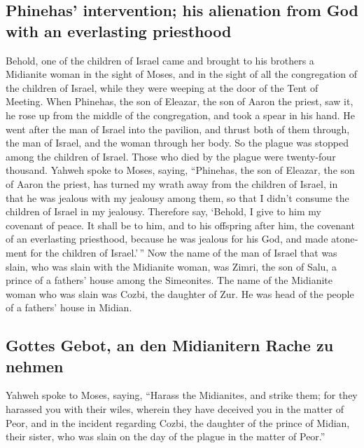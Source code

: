 \begin{paracol}{2}
\begin{otherlanguage}{english}
\hypertarget{phinehas-intervention-his-alienation-from-god-with-an-everlasting-priesthood}{%
\subsection{Phinehas' intervention; his alienation from God with an
everlasting
priesthood}\label{phinehas-intervention-his-alienation-from-god-with-an-everlasting-priesthood}}

 Behold, one of the children of Israel came and brought to
his brothers a Midianite woman in the sight of Moses, and in the sight
of all the congregation of the children of Israel, while they were
weeping at the door of the Tent of Meeting.  When
Phinehas, the son of Eleazar, the son of Aaron the priest, saw it, he
rose up from the middle of the congregation, and took a spear in his
hand.  He went after the man of Israel into the pavilion,
and thrust both of them through, the man of Israel, and the woman
through her body. So the plague was stopped among the children of
Israel.  Those who died by the plague were twenty-four
thousand.  Yahweh spoke to Moses, saying, 
``Phinehas, the son of Eleazar, the son of Aaron the priest, has turned
my wrath away from the children of Israel, in that he was jealous with
my jealousy among them, so that I didn't consume the children of Israel
in my jealousy.  Therefore say, `Behold, I give to him my
covenant of peace.  It shall be to him, and to his
offspring after him, the covenant of an everlasting priesthood, because
he was jealous for his God, and made atonement for the children of
Israel.'\,''  Now the name of the man of Israel that was
slain, who was slain with the Midianite woman, was Zimri, the son of
Salu, a prince of a fathers' house among the Simeonites. 
The name of the Midianite woman who was slain was Cozbi, the daughter of
Zur. He was head of the people of a fathers' house in Midian.

\hypertarget{gottes-gebot-an-den-midianitern-rache-zu-nehmen-1}{%
\subsection{Gottes Gebot, an den Midianitern Rache zu
nehmen}\label{gottes-gebot-an-den-midianitern-rache-zu-nehmen-1}}

 Yahweh spoke to Moses, saying,  ``Harass
the Midianites, and strike them;  for they harassed you
with their wiles, wherein they have deceived you in the matter of Peor,
and in the incident regarding Cozbi, the daughter of the prince of
Midian, their sister, who was slain on the day of the plague in the
matter of Peor.''


\end{otherlanguage}
\end{paracol}
